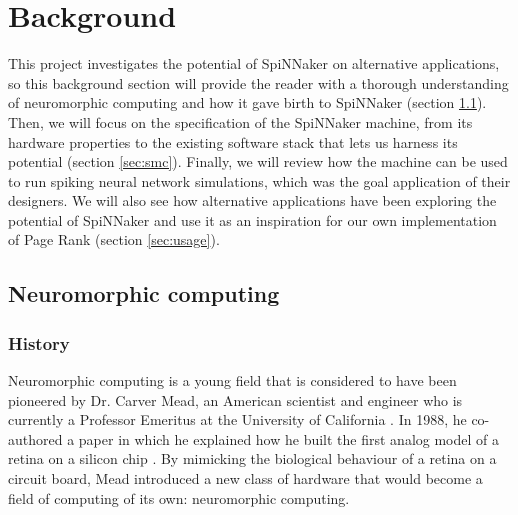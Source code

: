 \section{Background} \label{sec:bg}


This project investigates the potential of SpiNNaker on alternative applications, so this background section will provide the reader with a thorough understanding of neuromorphic computing and how it gave birth to SpiNNaker (section \ref{sec:nmc}). Then, we will focus on the specification of the SpiNNaker machine, from its hardware properties to the existing software stack that lets us harness its potential (section \ref{sec:smc}). Finally, we will review how the machine can be used to run spiking neural network simulations, which was the goal application of their designers. We will also see how alternative applications have been exploring the potential of SpiNNaker and use it as an inspiration for our own implementation of Page Rank (section \ref{sec:usage}).

\subsection{Neuromorphic computing} \label{sec:nmc}

\subsubsection{History}

Neuromorphic computing is a young field that is considered to have been pioneered by Dr. Carver Mead, an American scientist and engineer who is currently a Professor Emeritus at the University of California \cite{mead}. In 1988, he co-authored a paper in which he explained how he built the first analog model of a retina on a silicon chip \cite{retina}. By mimicking the biological behaviour of a retina on a circuit board, Mead introduced a new class of hardware that would become a field of computing of its own: neuromorphic computing. \\

